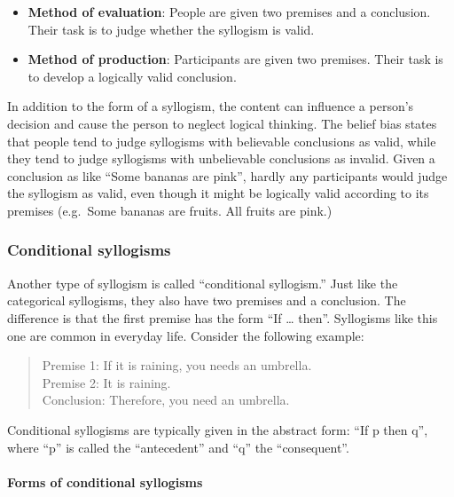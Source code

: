 \documentclass[
]{krantz}
\providecommand{\tightlist}{%
  \setlength{\itemsep}{0pt}\setlength{\parskip}{0pt}}
\begin{document}
\begin{itemize}
\tightlist
\item
  \textbf{Method of evaluation}: People are given two premises and a conclusion. Their task is to judge whether the syllogism is valid.
\item
  \textbf{Method of production}: Participants are given two premises. Their task is to develop a logically valid conclusion.
\end{itemize}

In addition to the form of a syllogism, the content can influence a person's decision and cause the person to neglect logical thinking. The belief bias states that people tend to judge syllogisms with believable conclusions as valid, while they tend to judge syllogisms with unbelievable conclusions as invalid. Given a conclusion as like ``Some bananas are pink'', hardly any participants would judge the syllogism as valid, even though it might be logically valid according to its premises (e.g.~Some bananas are fruits. All fruits are pink.)

\subsubsection*{Conditional syllogisms}\label{conditional-syllogisms}


Another type of syllogism is called ``conditional syllogism.'' Just like the categorical syllogisms, they also have two premises and a conclusion. The difference is that the first premise has the form ``If \ldots{} then''. Syllogisms like this one are common in everyday life. Consider the following example:

\begin{quote}
Premise 1: If it is raining, you needs an umbrella.\\
Premise 2: It is raining.\\
Conclusion: Therefore, you need an umbrella.
\end{quote}

Conditional syllogisms are typically given in the abstract form: ``If p then q'', where ``p'' is called the ``antecedent'' and ``q'' the ``consequent''.

\paragraph*{Forms of conditional syllogisms}\label{forms-of-conditional-syllogisms}
\end{document}
